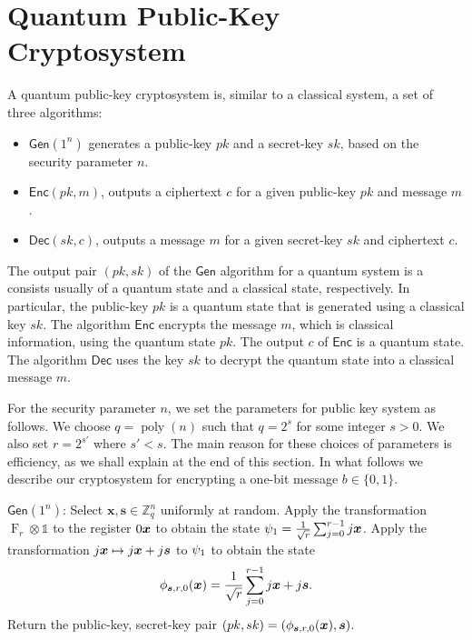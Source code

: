 \documentclass[11pt]{article}
\theoremstyle{plain}
\theoremstyle{definition}
\DeclareMathOperator{\poly}{poly}
\DeclareMathOperator{\qft}{F}
\let\ket\relax
\DeclarePairedDelimiter{\ket}{\lvert}{\rangle}
\def\Z{\mathbb{Z}}
\def\gen{\mathsf{Gen}}
\def\enc{\mathsf{Enc}}
\def\dec{\mathsf{Dec}}
\begin{document}



\section{Quantum Public-Key Cryptosystem}

A quantum public-key cryptosystem is, similar to a classical system, a set of three algorithms:
\begin{itemize}[itemsep = 1pt]
\item $\gen(1^n)$ generates a public-key $pk$ and a secret-key $sk$, based on the security parameter $n$.
\item $\enc(pk, m)$, outputs a ciphertext $c$ for a given public-key $pk$ and message $m$.
\item $\dec(sk, c)$, outputs a message $m$ for a given secret-key $sk$ and ciphertext $c$.
\end{itemize}
The output pair $(pk, sk)$ of the $\gen$ algorithm for a quantum system is a consists usually of a quantum state and a classical state, respectively. In particular, the public-key $pk$ is a quantum state that is generated using a classical key $sk$. The algorithm $\enc$ encrypts the message $m$, which is classical information, using the quantum state $pk$. The output $c$ of $\enc$ is a quantum state. The algorithm $\dec$ uses the key $sk$ to decrypt the quantum state into a classical message $m$.

For the security parameter $n$, we set the parameters for public key system as follows. We choose $q = \poly(n)$ such that $q = 2^s$ for some integer $s > 0$. We also set $r = 2^{s'}$ where $s' < s$. The main reason for these choices of parameters is efficiency, as we shall explain at the end of this section. In what follows we describe our cryptosystem for encrypting a one-bit message $b \in \{ 0, 1 \}$.

\vspace*{\topskip}

$\gen(1^n)$: Select $\bm{x}, \bm{s} \in \Z_q^n$ uniformly at random. Apply the transformation $\qft_r \otimes \mathds{1}$ to the register $\ket{0} \ket{\bm{x}}$ to obtain the state $\ket{\psi_1} = \frac{1}{\sqrt{r}} \sum_{j = 0}^{r - 1} \ket{j} \ket{\bm{x}}$. Apply the transformation $\ket{j}\ket{\bm{x}} \mapsto \ket{j}\ket{\bm{x} + j\bm{s}}$ to $\ket{\psi_1}$ to obtain the state
\[ \ket{\phi_{\bm{s}, r, 0}(\bm{x})} = \frac{1}{\sqrt{r}} \sum_{j = 0}^{r - 1} \ket{j} \ket{\bm{x} + j\bm{s}}. \]
Return the public-key, secret-key pair $(pk, sk) = (\ket{\phi_{\bm{s}, r, 0}(\bm{x})}, \bm{s})$.     
\end{document}
